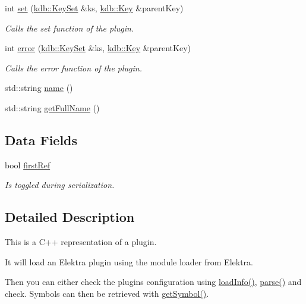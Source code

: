 \begin{DoxyCompactItemize}
int \hyperlink{classkdb_1_1tools_1_1Plugin_abf84d512b48f6fa1b89636217537cde0}{set} (\hyperlink{classkdb_1_1KeySet}{kdb\+::\+Key\+Set} \&ks, \hyperlink{classkdb_1_1Key}{kdb\+::\+Key} \&parent\+Key)
\begin{DoxyCompactList}\small\item\em Calls the set function of the plugin. \end{DoxyCompactList}\item 
int \hyperlink{classkdb_1_1tools_1_1Plugin_a8ec348b49a34ef17fda64cb289b8cf64}{error} (\hyperlink{classkdb_1_1KeySet}{kdb\+::\+Key\+Set} \&ks, \hyperlink{classkdb_1_1Key}{kdb\+::\+Key} \&parent\+Key)
\begin{DoxyCompactList}\small\item\em Calls the error function of the plugin. \end{DoxyCompactList}\item 
std\+::string \hyperlink{classkdb_1_1tools_1_1Plugin_ae4b82f943d0cdb0dd355924aa3201d6f}{name} ()
\item 
std\+::string \hyperlink{classkdb_1_1tools_1_1Plugin_acbe982e7bbb71aafb49b0d632e8650c9}{get\+Full\+Name} ()
\end{DoxyCompactItemize}
\subsection*{Data Fields}
\begin{DoxyCompactItemize}
\item 
bool \hyperlink{classkdb_1_1tools_1_1Plugin_aee8ae2b5708c74d4ccdc1bf9e8794636}{first\+Ref}
\begin{DoxyCompactList}\small\item\em Is toggled during serialization. \end{DoxyCompactList}\end{DoxyCompactItemize}


\subsection{Detailed Description}
This is a C++ representation of a plugin. 

It will load an Elektra plugin using the module loader from Elektra.

Then you can either check the plugins configuration using \hyperlink{classkdb_1_1tools_1_1Plugin_a3a0c6a956d1714002ef9baf8c9d99167}{load\+Info()}, \hyperlink{classkdb_1_1tools_1_1Plugin_adfcba2fbdeb436a1083410df804d5fb0}{parse()} and check. Symbols can then be retrieved with \hyperlink{classkdb_1_1tools_1_1Plugin_aca31140802ab463d5bddd95dee73194d}{get\+Symbol()}.

